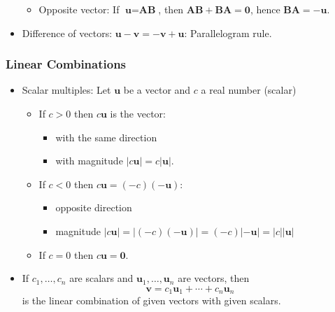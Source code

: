 \begin{frame}
\begin{itemize}
\begin{itemize}
      \item<8-> Opposite vector: If $\textbf{u}=\textbf{AB}$, then $\textbf{AB} + \textbf{BA} = \textbf{0}$,
      hence $\textbf{BA} = -\textbf{u}$.
    \end{itemize}
    \item<9-> Difference of vectors: $\textbf{u}-\textbf{v} = -\textbf{v}+\textbf{u}\textbf{}$: Parallelogram rule.

  \end{itemize}

\end{frame}

\begin{frame}
 \frametitle{Linear Combinations}

\begin{itemize}
 \item Scalar multiples: Let $\textbf{u}$ be a vector and $c$ a real number (scalar)
  \begin{itemize}
    \item If $c >0$ then $c\textbf{u}$ is the vector: \pause
    \begin{itemize}
      \item with the same direction
      \item with magnitude $|c\textbf{u}| = c|\textbf{u}|$.
    \end{itemize}\pause
     \item If $c<0$ then $c\textbf{u} = (-c)(-\textbf{u})$: \pause
     \begin{itemize}
	\item opposite direction
	\item magnitude $|c\textbf{u}| = |(-c)(-\textbf{u})| = (-c)|-\textbf{u}| = |c||\textbf{u}|$
     \end{itemize}\pause
     \item If $c=0$ then \pause $c\textbf{u} = \textbf{0}$. \pause
  \end{itemize}
  \item If $c_1, \ldots , c_n$ are scalars and $\textbf{u}_1,\ldots,\textbf{u}_n$ are vectors, then
%
$$\textbf{v} = c_1\textbf{u}_1+ \dotsb + c_n \textbf{u}_n$$
%
is the linear combination of given vectors with given scalars.
\end{itemize}

\end{frame}

